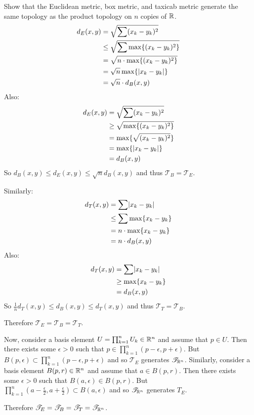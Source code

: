 \documentclass[letterpaper,12pt,fleqn]{article}
\newcommand{\T}{\mathscr{T}}
\newcommand{\e}{\epsilon}
\begin{document}
\begin{example}
  Show that the Euclidean metric, box metric, and taxicab metric generate the same topology as the product
  topology on \(n\) copies of \(\mathbb{R}\).
  \begin{align*}
    d_E(x,y) &= \sqrt{\sum(x_k-y_k)^2} \\
    &\le \sqrt{\sum\max\{(x_k-y_k)^2\}} \\
    &= \sqrt{n\cdot\max\{(x_k-y_k)^2\}} \\
    &=\sqrt{n}\max\{\lvert x_k-y_k\rvert\} \\
    &= \sqrt{n}\cdot d_B(x,y) \\
  \end{align*}
  Also:
  \begin{align*}
    d_E(x,y) &= \sqrt{\sum(x_k-y_k)^2} \\
    &\ge \sqrt{\max\{(x_k-y_k)^2\}} \\
    &= \max\{\sqrt{(x_k-y_k)^2}\} \\
    &= \max\{\lvert x_k-y_k\rvert\} \\
    &= d_B(x,y)
  \end{align*}
  So \(d_B(x,y)\le d_E(x,y)\le\sqrt{n}d_B(x,y)\) and thus \(\T_B=\T_E\).

  Similarly:
  \begin{align*}
    d_T(x,y) &= \sum\lvert x_k-y_k\rvert \\
    &\le \sum\max\{x_k-y_k\} \\
    &= n\cdot\max\{x_k-y_k\} \\
    &= n\cdot d_B(x,y)
  \end{align*}
  Also:
  \begin{align*}
    d_T(x,y) &= \sum\lvert x_k-y_k\rvert \\
    &\ge \max\{x_k-y_k\} \\
    &= d_B(x,y)
  \end{align*}
  So \(\frac{1}{n}d_T(x,y)\le d_B(x,y)\le d_T(x,y)\) and thus \(\T_T=\T_B\).

  Therefore \(\T_E=\T_B=\T_T\).

  Now, consider a basis element \(U=\prod_{k=1}^nU_k\in\mathbb{R}^n\) and assume that \(p\in U\).  Then there exists some
  \(\e>0\) such that \(p\in\prod_{k=1}^n(p-\e,p+\e)\).  But \(B(p,\e)\subset\prod_{k=1}^n(p-\e,p+\e)\) and so
  \(\T_E\) generates \(\T_{\R^n}\).  Similarly, consider a basis element \(B(p,r)\in\mathbb{R}^n\) and assume that
  \(a\in B(p,r)\).  Then there exists some \(\e>0\) such that \(B(a,\e)\in B(p,r)\).  But
  \(\prod_{k=1}^n\left(a-\frac{\e}{2},a+\frac{\e}{2}\right)\subset B(a,\e)\) and so \(\T_{\R^n}\) generates \(T_E\).

  Therefore \(\T_E=\T_B=\T_T=\T_{\R^n}\).
\end{example}
\end{document}

